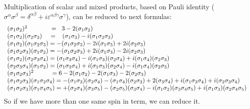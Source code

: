 \documentclass[a4paper]{jpconf}
\renewcommand\[{\begin{equation}}
\renewcommand\]{\end{equation}}
\begin{document}
Multiplication of scalar and mixed products, based on Pauli identity (${\sigma ^\alpha }{\sigma ^\beta } = {\delta ^{\alpha \beta }} + i{\varepsilon ^{\alpha \beta \gamma }}{\sigma ^\gamma }$), can be reduced to next formulas:
\[\begin{array}{l}
{({{\bf{\sigma }}_1}{{\bf{\sigma }}_2})^2}\qquad \quad {\mkern 1mu} {\mkern 1mu}  = \;\;{\mkern 1mu} 3 - 2({{\bf{\sigma }}_1}{{\bf{\sigma }}_2})\\
({{\bf{\sigma }}_1}{{\bf{\sigma }}_2})({{\bf{\sigma }}_2}{{\bf{\sigma }}_3})\;\;\;\; = \;\;\;({{\bf{\sigma }}_1}{{\bf{\sigma }}_3}) - i({{\bf{\sigma }}_1}{{\bf{\sigma }}_2}{{\bf{\sigma }}_3})\\
({{\bf{\sigma }}_1}{{\bf{\sigma }}_2})({{\bf{\sigma }}_1}{{\bf{\sigma }}_2}{{\bf{\sigma }}_3}) =  - ({{\bf{\sigma }}_1}{{\bf{\sigma }}_2}{{\bf{\sigma }}_3}) - 2i({{\bf{\sigma }}_1}{{\bf{\sigma }}_3}) + 2i({{\bf{\sigma }}_2}{{\bf{\sigma }}_3})\\
({{\bf{\sigma }}_1}{{\bf{\sigma }}_2}{{\bf{\sigma }}_3})({{\bf{\sigma }}_1}{{\bf{\sigma }}_2}) =  - ({{\bf{\sigma }}_1}{{\bf{\sigma }}_2}{{\bf{\sigma }}_3}) + 2i({{\bf{\sigma }}_1}{{\bf{\sigma }}_3}) - 2i({{\bf{\sigma }}_2}{{\bf{\sigma }}_3})\\
({{\bf{\sigma }}_1}{{\bf{\sigma }}_2})({{\bf{\sigma }}_2}{{\bf{\sigma }}_3}{{\bf{\sigma }}_4}) = ({{\bf{\sigma }}_1}{{\bf{\sigma }}_3}{{\bf{\sigma }}_4}) - i({{\bf{\sigma }}_1}{{\bf{\sigma }}_3})({{\bf{\sigma }}_2}{{\bf{\sigma }}_4}) + i({{\bf{\sigma }}_1}{{\bf{\sigma }}_4})({{\bf{\sigma }}_2}{{\bf{\sigma }}_3})\\
({{\bf{\sigma }}_2}{{\bf{\sigma }}_3}{{\bf{\sigma }}_4})({{\bf{\sigma }}_1}{{\bf{\sigma }}_2}) = ({{\bf{\sigma }}_1}{{\bf{\sigma }}_3}{{\bf{\sigma }}_4}) + i({{\bf{\sigma }}_1}{{\bf{\sigma }}_3})({{\bf{\sigma }}_2}{{\bf{\sigma }}_4}) - i({{\bf{\sigma }}_1}{{\bf{\sigma }}_4})({{\bf{\sigma }}_2}{{\bf{\sigma }}_3})\\
{({{\bf{\sigma }}_1}{{\bf{\sigma }}_2}{{\bf{\sigma }}_3})^2}{\mkern 1mu} {\mkern 1mu} {\mkern 1mu} \qquad {\mkern 1mu}  = 6 - 2({{\bf{\sigma }}_1}{{\bf{\sigma }}_2}) - 2({{\bf{\sigma }}_1}{{\bf{\sigma }}_3}) - 2({{\bf{\sigma }}_2}{{\bf{\sigma }}_3})\\
({{\bf{\sigma }}_1}{{\bf{\sigma }}_2}{{\bf{\sigma }}_3})({{\bf{\sigma }}_1}{{\bf{\sigma }}_2}{{\bf{\sigma }}_4}) =  - ({{\bf{\sigma }}_1}{{\bf{\sigma }}_3})({{\bf{\sigma }}_2}{{\bf{\sigma }}_4}) - ({{\bf{\sigma }}_1}{{\bf{\sigma }}_4})({{\bf{\sigma }}_2}{{\bf{\sigma }}_3}) + 2({{\bf{\sigma }}_3}{{\bf{\sigma }}_4}) + i({{\bf{\sigma }}_1}{{\bf{\sigma }}_3}{{\bf{\sigma }}_4}) + i({{\bf{\sigma }}_2}{{\bf{\sigma }}_3}{{\bf{\sigma }}_4})\\
({{\bf{\sigma }}_1}{{\bf{\sigma }}_2}{{\bf{\sigma }}_3})({{\bf{\sigma }}_1}{{\bf{\sigma }}_4}{{\bf{\sigma }}_5}) =  + ({{\bf{\sigma }}_2}{{\bf{\sigma }}_4})({{\bf{\sigma }}_3}{{\bf{\sigma }}_5}) - ({{\bf{\sigma }}_2}{{\bf{\sigma }}_5})({{\bf{\sigma }}_3}{{\bf{\sigma }}_4}) - i({{\bf{\sigma }}_1}{{\bf{\sigma }}_2})({{\bf{\sigma }}_3}{{\bf{\sigma }}_4}{{\bf{\sigma }}_5}) + i({{\bf{\sigma }}_1}{{\bf{\sigma }}_3})({{\bf{\sigma }}_2}{{\bf{\sigma }}_4}{{\bf{\sigma }}_5})
\end{array}\]
So if we have more than one same spin in term, we can reduce it.
\end{document}
